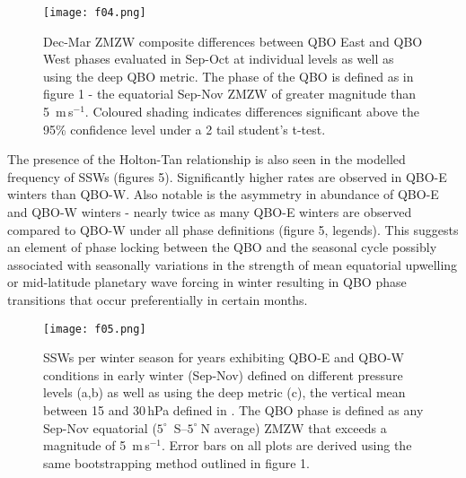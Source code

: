 \documentclass[wcd, manuscript]{copernicus}
\begin{document}

\begin{center}
\begin{figure}[h!]
\noindent\texttt{[image: f04.png]}
\caption{Dec-Mar ZMZW composite differences between QBO East and QBO West phases evaluated in Sep-Oct at individual levels as well as using the deep QBO metric. The phase of the QBO is defined as in figure 1 - the equatorial Sep-Nov ZMZW of greater magnitude than 5\ m\,s$^{-1}$. Coloured shading indicates differences significant above the 95\% confidence level under a 2 tail student’s t-test.}
\label{fig1}
\end{figure}
\end{center}

The presence of the Holton-Tan relationship is also seen in the modelled frequency of SSWs (figures 5). Significantly higher rates are observed in QBO-E winters than QBO-W. Also notable is the asymmetry in abundance of QBO-E and QBO-W winters - nearly twice as many QBO-E winters are observed compared to QBO-W under all phase definitions (figure 5, legends). This suggests an element of phase locking between the QBO and the seasonal cycle possibly associated with seasonally variations in the strength of mean equatorial upwelling or mid-latitude planetary wave forcing in winter \citep{Pascoe2005, Gruzdez2000, Kylash2015} resulting in QBO phase transitions that occur preferentially in certain months. 

\begin{center}
\begin{figure}[h!]
\noindent\texttt{[image: f05.png]}
\caption{SSWs per winter season for years exhibiting QBO-E and QBO-W conditions in early winter (Sep-Nov) defined on different pressure levels (a,b) as well as using the deep metric (c), the vertical mean between 15 and 30\,hPa defined in \cite{Andrews2019}. The QBO phase is defined as any Sep-Nov equatorial ($5^{\circ}$\ S--$5^{\circ}\ $N average) ZMZW that exceeds a magnitude of 5\ m\,s$^{-1}$. Error bars on all plots are derived using the same bootstrapping method outlined in figure 1.}
\label{fig1}
\end{figure}
\end{center}
\end{document}
